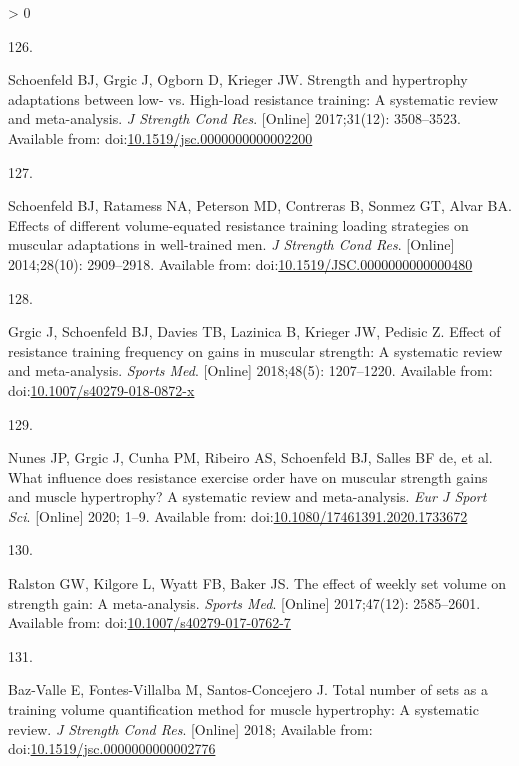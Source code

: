 \documentclass[twoside,10pt]{gihclass} %
\newlength{\cslhangindent}
\newlength{\csllabelwidth}
\newenvironment{CSLReferences}[3] %
 {%
  \setlength{\parindent}{0pt}
  \ifodd #1 \everypar{\setlength{\hangindent}{\cslhangindent}}\ignorespaces\fi
  \ifnum #2 > 0
  \setlength{\parskip}{#2\baselineskip}
  \fi
 }%
 {}
\newcommand{\CSLLeftMargin}[1]{\parbox[t]{\maxof{\widthof{#1}}{\csllabelwidth}}{#1}}
\newcommand{\CSLRightInline}[1]{\parbox[t]{\linewidth}{#1}}
\begin{document}
\begin{CSLReferences}{0}{0}
\leavevmode\hypertarget{ref-RN2569}{}%
\CSLLeftMargin{126. }
\CSLRightInline{Schoenfeld BJ, Grgic J, Ogborn D, Krieger JW. Strength and hypertrophy adaptations between low- vs. High-load resistance training: A systematic review and meta-analysis. \emph{J Strength Cond Res}. {[}Online{]} 2017;31(12): 3508--3523. Available from: doi:\href{https://doi.org/10.1519/jsc.0000000000002200}{10.1519/jsc.0000000000002200}}

\leavevmode\hypertarget{ref-RN1612}{}%
\CSLLeftMargin{127. }
\CSLRightInline{Schoenfeld BJ, Ratamess NA, Peterson MD, Contreras B, Sonmez GT, Alvar BA. Effects of different volume-equated resistance training loading strategies on muscular adaptations in well-trained men. \emph{J Strength Cond Res}. {[}Online{]} 2014;28(10): 2909--2918. Available from: doi:\href{https://doi.org/10.1519/JSC.0000000000000480}{10.1519/JSC.0000000000000480}}

\leavevmode\hypertarget{ref-RN2570}{}%
\CSLLeftMargin{128. }
\CSLRightInline{Grgic J, Schoenfeld BJ, Davies TB, Lazinica B, Krieger JW, Pedisic Z. Effect of resistance training frequency on gains in muscular strength: A systematic review and meta-analysis. \emph{Sports Med}. {[}Online{]} 2018;48(5): 1207--1220. Available from: doi:\href{https://doi.org/10.1007/s40279-018-0872-x}{10.1007/s40279-018-0872-x}}

\leavevmode\hypertarget{ref-RN2591}{}%
\CSLLeftMargin{129. }
\CSLRightInline{Nunes JP, Grgic J, Cunha PM, Ribeiro AS, Schoenfeld BJ, Salles BF de, et al. What influence does resistance exercise order have on muscular strength gains and muscle hypertrophy? A systematic review and meta-analysis. \emph{Eur J Sport Sci}. {[}Online{]} 2020; 1--9. Available from: doi:\href{https://doi.org/10.1080/17461391.2020.1733672}{10.1080/17461391.2020.1733672}}

\leavevmode\hypertarget{ref-RN2492}{}%
\CSLLeftMargin{130. }
\CSLRightInline{Ralston GW, Kilgore L, Wyatt FB, Baker JS. The effect of weekly set volume on strength gain: A meta-analysis. \emph{Sports Med}. {[}Online{]} 2017;47(12): 2585--2601. Available from: doi:\href{https://doi.org/10.1007/s40279-017-0762-7}{10.1007/s40279-017-0762-7}}

\leavevmode\hypertarget{ref-RN2130}{}%
\CSLLeftMargin{131. }
\CSLRightInline{Baz-Valle E, Fontes-Villalba M, Santos-Concejero J. Total number of sets as a training volume quantification method for muscle hypertrophy: A systematic review. \emph{J Strength Cond Res}. {[}Online{]} 2018; Available from: doi:\href{https://doi.org/10.1519/jsc.0000000000002776}{10.1519/jsc.0000000000002776}}


\end{CSLReferences}
\end{document}

